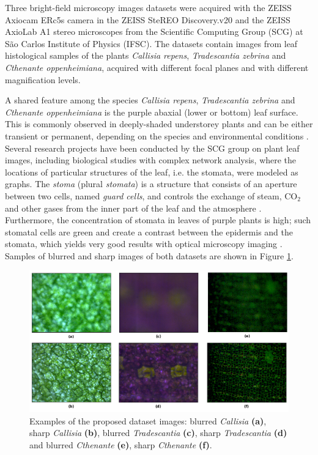 Three bright-field microscopy images datasets were acquired with the ZEISS Axiocam ERc5s camera in the ZEISS SteREO Discovery.v20 and the ZEISS AxioLab A1 stereo microscopes from the Scientific Computing Group (SCG) at São Carlos Institute of Physics (IFSC). The datasets contain images from leaf histological samples of the plants \textit{Callisia repens}, \textit{Tradescantia zebrina} and \textit{Cthenante oppenheimiana}, acquired with different focal planes and with different magnification levels. 

A shared feature among the species \textit{Callisia repens}, \textit{Tradescantia zebrina} and \textit{Cthenante oppenheimiana} is the purple abaxial (lower or bottom) leaf surface. This is commonly observed in deeply-shaded understorey plants and can be either transient or permanent, depending on the species and environmental conditions \cite{filho2018plants}. Several research projects have been conducted by the SCG group on plant leaf images, including biological studies with complex network analysis, where the locations of particular structures of the leaf, i.e. the stomata, were modeled as graphs. The \emph{stoma} (plural \emph{stomata}) is a structure that consists of an aperture between two cells, named \emph{guard cells}, and controls the exchange of steam, CO$_{2}$ and other gases from the inner part of the leaf and the atmosphere  \cite{hetherington2003role}. Furthermore, the concentration of stomata in leaves of purple plants is high; such stomatal cells are green and create a contrast between the epidermis and the stomata, which yields very good results with optical microscopy imaging \cite{filho2018plants}. Samples of blurred and sharp images of both datasets are shown in Figure \ref{fig:datasets}.

\begin{figure}[ht]
	\centering
	\caption{Examples of the proposed dataset images: blurred \textit{Callisia} \textbf{(a)}, sharp \textit{Callisia} \textbf{(b)}, blurred \textit{Tradescantia} \textbf{(c)}, sharp \textit{Tradescantia} \textbf{(d)} and blurred \textit{Cthenante} \textbf{(e)}, sharp \textit{Cthenante} \textbf{(f)}.}
	\label{fig:datasets}
	\includegraphics[scale=0.4]{images/datasets.png}
	\centering
	\fautor
\end{figure}

